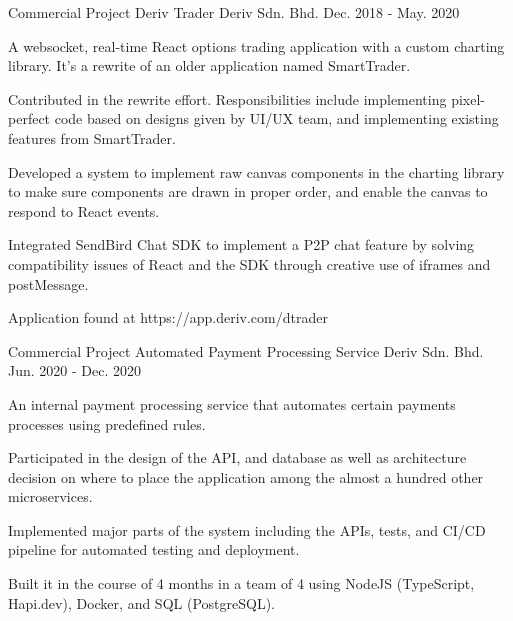 

\begin{cventries}

  \cventry
    {Commercial Project} %
    {Deriv Trader} %
    {Deriv Sdn. Bhd.} %
    {Dec. 2018 - May. 2020} %
    {
      \begin{cvitems} %
        \item {A websocket, real-time React options trading application with a custom charting library. It's a rewrite of an older application named SmartTrader.}
        \item {Contributed in the rewrite effort. Responsibilities include implementing pixel-perfect code based on designs given by UI/UX team, and implementing existing features from SmartTrader.}
        \item {Developed a system to implement raw canvas components in the charting library to make sure components are drawn in proper order, and enable the canvas to respond to React events.}
        \item {Integrated SendBird Chat SDK to implement a P2P chat feature by solving compatibility issues of React and the SDK through creative use of iframes and postMessage. }
        \item {Application found at https://app.deriv.com/dtrader}
      \end{cvitems}
    }

  \cventry
    {Commercial Project} %
    {Automated Payment Processing Service} %
    {Deriv Sdn. Bhd.} %
    {Jun. 2020 - Dec. 2020} %
    {
      \begin{cvitems} %
        \item {An internal payment processing service that automates certain payments processes using predefined rules.}
        \item {Participated in the design of the API, and database as well as architecture decision on where to place the application among the almost a hundred other microservices.}
        \item {Implemented major parts of the system including the APIs, tests, and CI/CD pipeline for automated testing and deployment.}
        \item {Built it in the course of 4 months in a team of 4 using NodeJS (TypeScript, Hapi.dev), Docker, and SQL (PostgreSQL).}
      \end{cvitems}
    }

\end{cventries}